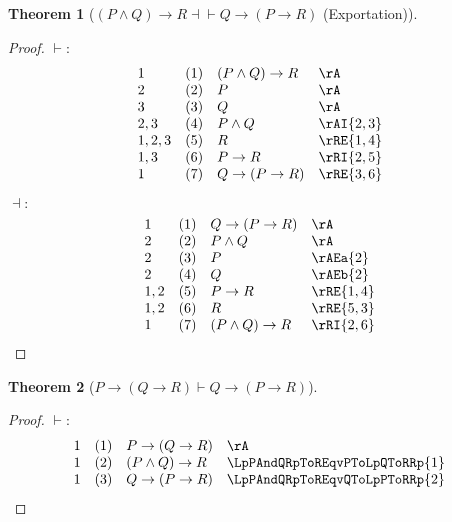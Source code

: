 \documentclass{book}
\theoremstyle{plain}
\newtheorem{theorem}{Theorem}
\theoremstyle{remark}
\theoremstyle{definition}
\begin{document}
\label{LpPAndQRpToREqvQToLpPToRRp}
\begin{theorem}[\( (P \land Q) \rightarrow R \dashv\vdash Q\rightarrow (P\rightarrow R) \) (Exportation)]
\end{theorem}
\begin{proof}
	\(\vdash:\)
	\[
	\begin{array}{llll}
		1 & (1) & (P \land Q) \rightarrow R & \rA \\
		2 & (2) & P & \rA \\
		3 & (3) & Q & \rA \\
		2,3 & (4) & P\land Q & \rAI{2,3} \\
		1,2,3 & (5) & R & \rRE{1,4} \\
		1,3 & (6) & P\rightarrow R & \rRI{2,5} \\
		1 & (7) & Q\rightarrow (P\rightarrow R) & \rRE{3,6} \\
	\end{array}		
	\]
	
	\(\dashv:\)
	\[
	\begin{array}{llll}
		1 & (1) & Q\rightarrow (P\rightarrow R) & \rA \\
		2 & (2) & P\land Q & \rA \\
		2 & (3) & P & \rAEa{2} \\
		2 & (4) & Q & \rAEb{2} \\
		1,2 & (5) & P\rightarrow R & \rRE{1,4} \\
		1,2 & (6) & R & \rRE{5,3} \\
		1 & (7) & (P\land Q)\rightarrow R & \rRI{2,6} \\
	\end{array}		
	\]
\end{proof}


\label{PToLpQToRRpImpQToLpPToRRp}
\begin{theorem}[\(P\rightarrow (Q\rightarrow R)\vdash  Q\rightarrow (P\rightarrow R)\)]
\end{theorem}
\begin{proof}
	\(\vdash:\)
	\[
	\begin{array}{llll}
		1 & (1) & P\rightarrow (Q\rightarrow R) & \rA \\
		1 & (2) & (P \land Q) \rightarrow R & \LpPAndQRpToREqvPToLpQToRRp{1} \\
		1 & (3) & Q\rightarrow (P\rightarrow R) & \LpPAndQRpToREqvQToLpPToRRp{2} \\
	\end{array}		
	\]
\end{proof}
\end{document}
